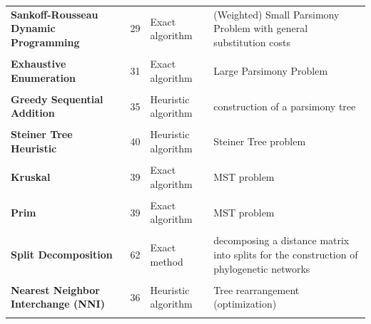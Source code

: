 \begin{table}[H]
\begin{tabular}{p{4cm}p{1cm}p{3cm}p{6cm}}
         \textbf{Sankoff-Rousseau Dynamic Programming}
        & 29
        & Exact algorithm
        & (Weighted) Small Parsimony Problem with general substitution costs \\ \\
        \textbf{Exhaustive Enumeration}
        & 31 & Exact algorithm & Large Parsimony Problem \\ \\
        \textbf{Greedy Sequential Addition}
        & 35& Heuristic algorithm & construction of a parsimony tree \\ \\
         \textbf{Steiner Tree Heuristic}
        & 40& Heuristic algorithm & Steiner Tree problem  \\ \\
        \textbf{Kruskal}
        & 39 & Exact algorithm & MST problem  \\ \\
          \textbf{Prim}
        & 39
        & Exact algorithm & MST problem \\ \\
        \textbf{Split Decomposition} & 62 & Exact method & decomposing a distance matrix into splits for the construction of phylogenetic networks \\ \\
        \textbf{Nearest Neighbor Interchange (NNI)} & 36 & Heuristic algorithm &  Tree rearrangement (optimization)   \\ \\
    \end{tabular}
\end{table}
